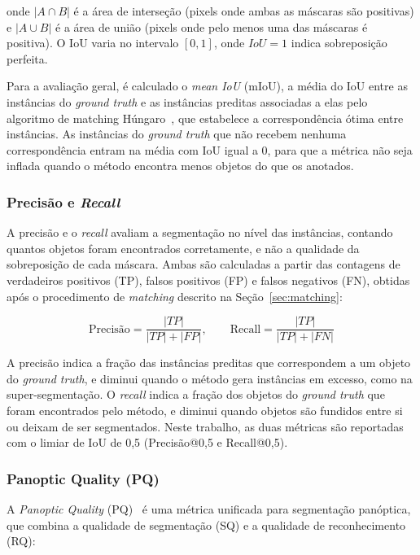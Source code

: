 onde $|A \cap B|$ é a área de interseção (pixels onde ambas as máscaras são positivas) e $|A \cup B|$ é a área de união (pixels onde pelo menos uma das máscaras é positiva). O IoU varia no intervalo $[0, 1]$, onde $IoU = 1$ indica sobreposição perfeita.

Para a avaliação geral, é calculado o \textit{mean IoU} (mIoU), a média do IoU entre as instâncias do \textit{ground truth} e as instâncias preditas associadas a elas pelo algoritmo de matching Húngaro~\cite{kuhn1955hungarian}, que estabelece a correspondência ótima entre instâncias. As instâncias do \textit{ground truth} que não recebem nenhuma correspondência entram na média com IoU igual a 0, para que a métrica não seja inflada quando o método encontra menos objetos do que os anotados.

\subsubsection{Precisão e \textit{Recall}}

A precisão e o \textit{recall} avaliam a segmentação no nível das instâncias, contando quantos objetos foram encontrados corretamente, e não a qualidade da sobreposição de cada máscara. Ambas são calculadas a partir das contagens de verdadeiros positivos (TP), falsos positivos (FP) e falsos negativos (FN), obtidas após o procedimento de \textit{matching} descrito na Seção~\ref{sec:matching}:

\[
\text{Precisão} = \frac{|TP|}{|TP| + |FP|}, \qquad \text{Recall} = \frac{|TP|}{|TP| + |FN|}
\]

A precisão indica a fração das instâncias preditas que correspondem a um objeto do \textit{ground truth}, e diminui quando o método gera instâncias em excesso, como na super-segmentação. O \textit{recall} indica a fração dos objetos do \textit{ground truth} que foram encontrados pelo método, e diminui quando objetos são fundidos entre si ou deixam de ser segmentados. Neste trabalho, as duas métricas são reportadas com o limiar de IoU de 0,5 (Precisão@0,5 e Recall@0,5).


\subsubsection{Panoptic Quality (PQ)}

A \textit{Panoptic Quality} (PQ)~\cite{kirillov2019panoptic} é uma métrica unificada para segmentação panóptica, que combina a qualidade de segmentação (SQ) e a qualidade de reconhecimento (RQ):

